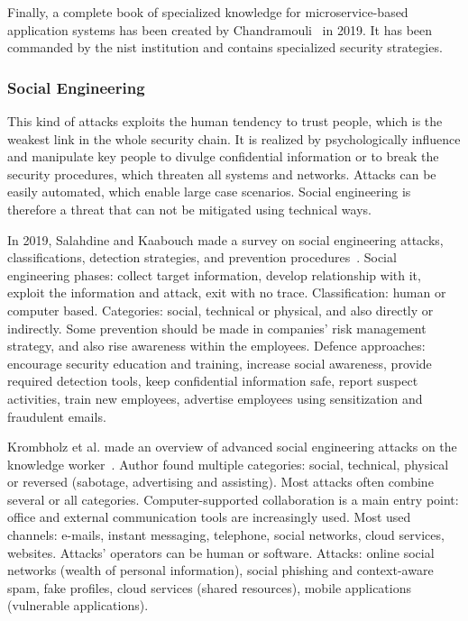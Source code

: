 Finally, a complete book of specialized knowledge for \gls{microservice}-based application systems has been created by Chandramouli~\cite{chandramouli_security_2019} in 2019. It has been commanded by the \gls{nist} institution and contains specialized security strategies.

\subsubsection{Social Engineering}
\label{subsubsec:state_review_results_socialengineering}

This kind of attacks exploits the human tendency to trust people, which is the weakest link in the whole security chain. It is realized by psychologically influence and manipulate key people to divulge confidential information or to break the security procedures, which threaten all systems and networks. Attacks can be easily automated, which enable large case scenarios. Social engineering is therefore a threat that can not be mitigated using technical ways.

In 2019, Salahdine and Kaabouch made a survey on social engineering attacks, classifications, detection strategies, and prevention procedures~\cite{salahdine_social_2019}. Social engineering phases: collect target information, develop relationship with it, exploit the information and attack, exit with no trace. Classification: human or computer based. Categories: social, technical or physical, and also directly or indirectly. Some prevention should be made in companies' risk management strategy, and also rise awareness within the employees. Defence approaches: encourage security education and training, increase social awareness, provide required detection tools, keep confidential information safe, report suspect activities, train new employees, advertise employees using sensitization and fraudulent emails. %

Krombholz et al. made an overview of advanced social engineering attacks on the knowledge worker~\cite{krombholz_advanced_2015}. Author found multiple categories: social, technical, physical or reversed (sabotage, advertising and assisting). Most attacks often combine several or all categories. Computer-supported collaboration is a main entry point: office and external communication tools are increasingly used. Most used channels: e-mails, instant messaging, telephone, social networks, \gls{cloud} services, websites. Attacks' operators can be human or software. Attacks: online social networks (wealth of personal information), social phishing and context-aware spam, fake profiles, cloud services (shared resources), mobile applications (vulnerable applications). %

